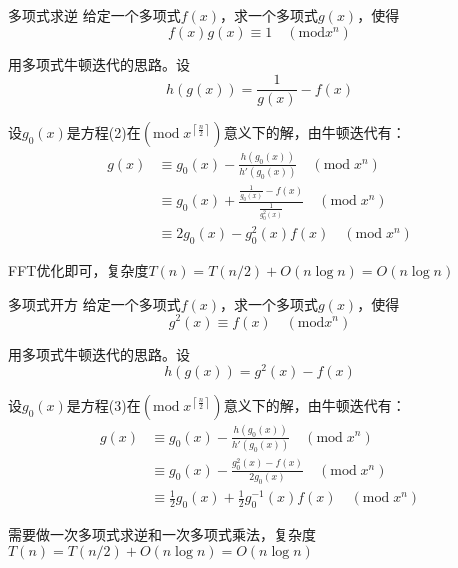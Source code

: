 \documentclass{beamer}
\begin{document}
\begin{frame}{多项式求逆}
    \small
    给定一个多项式$f(x)$，求一个多项式$g(x)$，使得
    \begin{equation}
        f(x)g(x) \equiv 1 \quad (\text{mod} x^n)
    \end{equation}

    \vspace{1em}\pause
    用多项式牛顿迭代的思路。设
    \begin{equation*}
        h(g(x))=\frac{1}{g(x)}-f(x)
    \end{equation*}

    \pause
    设$g_0(x)$是方程(2)在$(\text{mod}\;x^{\left\lceil\frac{n}{2}\right\rceil})$意义下的解，由牛顿迭代有：
    \begin{align*}
        g(x)&\equiv g_0(x) -\frac{h(g_0(x))}{h'(g_0(x))} \quad (\text{mod}\;x^n)\\
        &\equiv g_0(x) +\frac{\frac{1}{g_0(x)}-f(x)}{\frac{1}{g_0^2(x)}} \quad (\text{mod}\;x^n)\\
        &\equiv 2g_0(x)-g_0^2(x)f(x)\quad (\text{mod}\;x^n)
    \end{align*}

    FFT优化即可，复杂度$T(n)=T(n/2)+O(n\log n)=O(n\log n)$
\end{frame}

\begin{frame}{多项式开方}
    \small
    给定一个多项式$f(x)$，求一个多项式$g(x)$，使得
    \begin{equation}
        g^2(x) \equiv f(x) \quad (\text{mod} x^n)
    \end{equation}
    
    \vspace{1em}\pause
    用多项式牛顿迭代的思路。设
    \begin{equation*}
        h(g(x))=g^2(x)-f(x)
    \end{equation*}

    \pause
    设$g_0(x)$是方程(3)在$(\text{mod}\;x^{\left\lceil\frac{n}{2}\right\rceil})$意义下的解，由牛顿迭代有：
    \begin{align*}
        g(x)&\equiv g_0(x) -\frac{h(g_0(x))}{h'(g_0(x))} \quad (\text{mod}\;x^n)\\
        &\equiv g_0(x) -\frac{g_0^2(x)-f(x)}{2g_0(x)} \quad (\text{mod}\;x^n)\\
        &\equiv \frac{1}{2}g_0(x)+\frac{1}{2}g_0^{-1}(x)f(x)\quad (\text{mod}\;x^n)
    \end{align*}

    需要做一次多项式求逆和一次多项式乘法，复杂度$T(n)=T(n/2)+O(n\log n)=O(n\log n)$
\end{frame}
\end{document}
